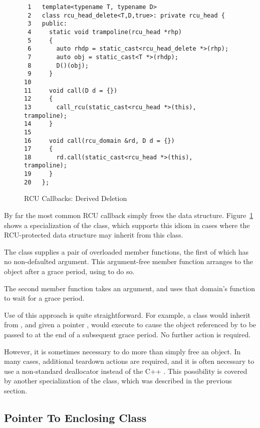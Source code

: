 \documentclass[letterpaper,twocolumn,10pt]{article}
\begin{document}
\begin{figure}[tbp]
{ \scriptsize
\begin{verbatim}
 1   template<typename T, typename D>
 2   class rcu_head_delete<T,D,true>: private rcu_head {
 3   public:
 4     static void trampoline(rcu_head *rhp)
 5     {
 6       auto rhdp = static_cast<rcu_head_delete *>(rhp);
 7       auto obj = static_cast<T *>(rhdp);
 8       D()(obj);
 9     }
10
11     void call(D d = {})
12     {
13       call_rcu(static_cast<rcu_head *>(this), trampoline);
14     }
15
16     void call(rcu_domain &rd, D d = {})
17     {
18       rd.call(static_cast<rcu_head *>(this), trampoline);
19     }
20   };
\end{verbatim}
}
\caption{RCU Callbacks: Derived Deletion}
\label{fig:RCU Callbacks: Derived Deletion}
\end{figure}

By far the most common RCU callback simply frees the data structure.
Figure~\ref{fig:RCU Callbacks: Derived Deletion}
shows a specialization of the  class, which supports
this idiom in cases where the RCU-protected data structure may inherit
from this class.

The  class supplies a pair of overloaded 
member functions, the first of which has no non-defaulted argument.
This argument-free member function arranges to  the
object after a grace period, using  to do so.

The second  member function takes an 
argument, and uses that domain's  function to wait
for a grace period.

Use of this approach is quite straightforward.
For example, a class  would inherit from
, and given a  pointer ,
would execute  to cause the object referenced
by  to be passed to  at the end of a subsequent
grace period.
No further action is required.

However, it is sometimes necessary to do more than simply free an
object.
In many cases, additional teardown actions are required, and
it is often necessary to use a non-standard deallocator instead
of the C++ .
This possibility is covered by another specialization of the
 class, which was described in the previous section.

\subsection{Pointer To Enclosing Class}
\label{sec:Pointer To Enclosing Class}
\end{document}
